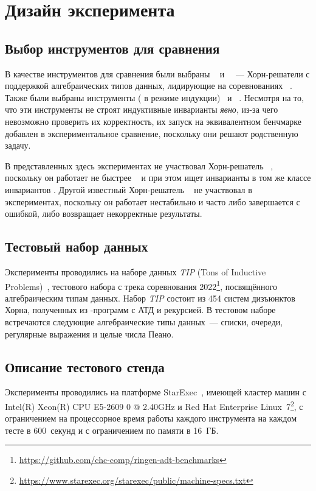 \section{Дизайн эксперимента}
\subsection{Выбор инструментов для сравнения}
В качестве инструментов для сравнения были выбраны \racer{}~\cite{10.1145/3498722} и \eldarica{}~\cite{8603013}~--- Хорн-решатели с поддержкой алгебраических типов данных, лидирующие на соревнованиях \chccomp{}~\cite{De_Angelis_2022}.
Также  были выбраны инструменты \cvcind{} (\cvc{} в режиме индукции)~\cite{reynolds2015induction} и \vericat{}~\cite{10.1093/logcom/exab090}.
Несмотря на то, что эти инструменты не строят индуктивные инварианты \emph{явно}, из-за чего невозможно проверить их корректность, их запуск на эквивалентном бенчмарке добавлен в экспериментальное сравнение, поскольку они решают родственную задачу.


В представленных здесь экспериментах не участвовал Хорн-решатель \hoice{}~\cite{10.1007/978-3-030-02768-1_8}, поскольку он работает не быстрее \racer{}~\cite{10.1145/3498722} и при этом ищет инварианты в том же классе инвариантов \elemclass{}.
Другой известный Хорн-решатель \rchc{}~\cite{haude2020} не участвовал в экспериментах, поскольку он работает нестабильно и  часто либо завершается с ошибкой, либо возвращает некорректные результаты.

\subsection{Тестовый набор данных}
Эксперименты проводились на наборе данных \emph{TIP} (Tons of Inductive Problems)~\cite{claessen2015tip}, тестового набора с трека соревнования \chccomp{} 2022\footnote{\url{https://github.com/chc-comp/ringen-adt-benchmarks}}, посвящённого алгебраическим типам данных. Набор \emph{TIP} состоит из 454 систем дизъюнктов Хорна, полученных из \haskell{}-программ с АТД и рекурсией.
В тестовом наборе встречаются следующие алгебраические типы данных~--- списки, очереди, регулярные выражения и целые числа Пеано.

\subsection{Описание тестового стенда}
Эксперименты проводились на платформе StarExec~\cite{stump2014starexec}, имеющей кластер машин с Intel(R) Xeon(R) CPU E5-2609 0 @ 2.40GHz и Red Hat Enterprise Linux~7\footnote{\url{https://www.starexec.org/starexec/public/machine-specs.txt}}, с ограничением на процессорное время работы каждого инструмента на каждом тесте в 600~секунд и с ограничением по памяти в 16~ГБ.

